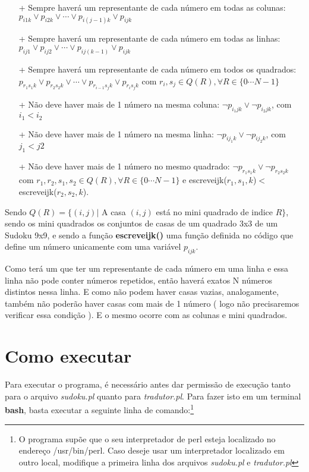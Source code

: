 \documentclass[11pt]{article}
\begin{document}
\begin{itemize}

 \item[+] Sempre haverá um representante de cada número em todas as colunas: $p_{i1k}\vee p_{i2k}\vee \cdots \vee p_{i(j-1)k}\vee p_{ijk}$
 \item[+] Sempre haverá um representante de cada número em todas as linhas:
 $p_{ij1}\vee p_{ij2}\vee \cdots \vee p_{ij(k-1)}\vee p_{ijk}$
 \item[+] Sempre haverá um representante de cada número em todos os quadrados:
 $p_{r_{1}s_{1}k}\vee p_{r_{2}s_{2}k}\vee \cdots \vee p_{r_{i-1}s_{j}k}\vee p_{r_{i}s_{j}k}$ com $r_{i}, s_{j} \in Q(R), \forall R \in \{0\cdots N-1\} $
 \item[+] Não deve haver mais de 1 número na mesma coluna:
 $\neg p_{i_{1}jk}\vee \neg p_{i_{2}jk}$, com $i_{1}<i_{2} $
 \item[+] Não deve haver mais de 1 número na mesma linha:
 $\neg p_{ij_{1}k}\vee \neg p_{ij_{2}k}  $, com $j_{1}<j{2} $
 \item[+] Não deve haver mais de 1 número no mesmo quadrado:
 $\neg p_{r_{1}s_{1}k}\vee \neg p_{r_{2}s_{2}k} $ com $r_{1},r_{2}, s_{1}, s_{2} \in Q(R), \forall R \in \{0\cdots N-1\}$ e escreveijk($r_{1},s_{1},k$)$<$ escreveijk($ r_{2},s_{2},k $).
 
 
\end{itemize}

Sendo $Q(R) = \{ (i,j) |$ A casa $(i,j)$ está no mini quadrado de indice $R \}$, sendo os mini quadrados os conjuntos de casas de um quadrado 3x3 de um Sudoku 9x9, e sendo a função \textbf{\color{red}escreveijk()} uma função definida no código que define um número unicamente com uma variável $p_{ijk}$.



Como terá um que ter um representante de cada número em uma linha e essa
 linha não pode conter números repetidos, então haverá exatos N números
 distintos nessa linha. E como não podem haver casas vazias, analogamente,
 também não poderão haver casas com mais de 1 número ( logo não precisaremos
 verificar essa condição ). E o mesmo ocorre com as colunas e mini quadrados.

\section{Como executar}

Para executar o programa, é necessário antes dar permissão de execução tanto para o arquivo \emph{sudoku.pl} quanto para \emph{tradutor.pl}. Para fazer isto em um terminal \textbf{\color{red}bash}, basta executar a seguinte linha de comando:\footnote{O programa supõe que o seu interpretador de perl esteja localizado no endereço {\color{red}/usr/bin/perl}. Caso deseje usar um interpretador localizado em outro local, modifique a primeira linha dos arquivos \emph{sudoku.pl} e \emph{tradutor.pl}}
\end{document}
